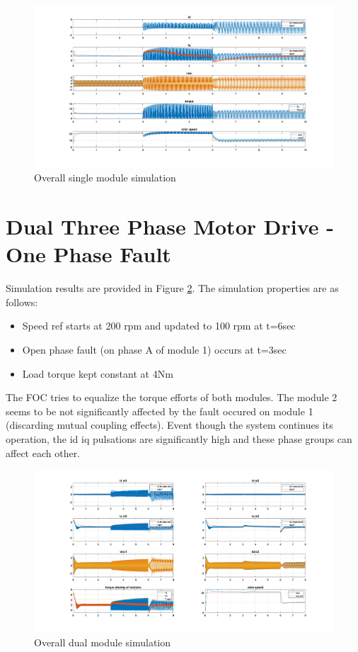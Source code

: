 \documentclass{article}
\begin{document}
\begin{figure}[h!]
\centering
\includegraphics[scale=0.3]{Figures/SingleModule/Overall.png}
\caption{Overall single module simulation}
\label{fig:overall_single}
\end{figure}


\section{Dual Three Phase Motor Drive - One Phase Fault}
Simulation results are provided in Figure \ref{fig:overall_dual}. The simulation properties are as follows:

\begin{itemize}
    \item Speed ref starts at 200 rpm and updated to 100 rpm at t=6sec
    \item Open phase fault (on phase A of module 1)  occurs at t=3sec
    \item Load torque kept constant at 4Nm
\end{itemize}

The FOC tries to equalize the torque efforts of both modules. The module 2 seems to be not significantly affected by the fault occured on module 1 (discarding mutual coupling effects). Event though the system continues its operation, the id iq pulsations are significantly high and these phase groups can affect each other.

\begin{figure}[h!]
\centering
\includegraphics[scale=0.3]{Figures/DualModule/Overall.png}
\caption{Overall dual module simulation}
\label{fig:overall_dual}
\end{figure}
\end{document}
